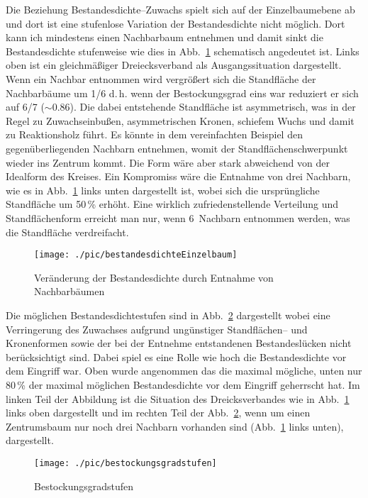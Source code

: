 \documentclass[twocolumn]{scrartcl}
\begin{document}
Die Beziehung Bestandesdichte--Zuwachs spielt sich auf der Einzelbaumebene ab
und dort ist eine stufenlose Variation der Bestandesdichte nicht möglich. Dort
kann ich mindestens einen Nachbarbaum entnehmen und damit sinkt die
Bestandesdichte stufenweise wie dies in Abb.~\ref{fig:bestandesdichteEinzelbaum}
schematisch angedeutet ist. Links oben ist ein gleichmäßiger Dreiecksverband als
Ausgangssituation dargestellt. Wenn ein Nachbar entnommen wird vergrößert sich
die Standfläche der Nachbarbäume um 1/6 d.\,h. wenn der Bestockungsgrad eins war
reduziert er sich auf 6/7 ($\sim 0.86$). Die dabei entstehende Standfläche ist
asymmetrisch, was in der Regel zu Zuwachseinbußen, asymmetrischen Kronen,
schiefem Wuchs und damit zu Reaktionsholz führt. Es könnte in dem vereinfachten
Beispiel den gegenüberliegenden Nachbarn entnehmen, womit der
Standflächenschwerpunkt wieder ins Zentrum kommt. Die Form wäre aber stark
abweichend von der Idealform des Kreises. Ein Kompromiss wäre die Entnahme von
drei Nachbarn, wie es in Abb.~\ref{fig:bestandesdichteEinzelbaum} links unten
dargestellt ist, wobei sich die ursprüngliche Standfläche um 50\,\% erhöht. Eine
wirklich zufriedenstellende Verteilung und Standflächenform erreicht man nur,
wenn 6~Nachbarn entnommen werden, was die Standfläche verdreifacht.

\begin{figure}[htbp]
  \centering
  \texttt{[image: ./pic/bestandesdichteEinzelbaum]}
  \caption{Veränderung der Bestandesdichte durch Entnahme von Nachbarbäumen}
  \label{fig:bestandesdichteEinzelbaum}
\end{figure}

Die möglichen Bestandesdichtestufen sind in Abb.~\ref{fig:bestockungsgradstufen}
dargestellt wobei eine Verringerung des Zuwachses aufgrund ungünstiger
Standflächen-- und Kronenformen sowie der bei der Entnehme entstandenen
Bestandeslücken nicht berücksichtigt sind. Dabei spiel es eine Rolle wie hoch
die Bestandesdichte vor dem Eingriff war. Oben wurde angenommen das die maximal
mögliche, unten nur 80\,\% der maximal möglichen Bestandesdichte vor dem
Eingriff geherrscht hat. Im linken Teil der Abbildung ist die Situation des
Dreicksverbandes wie in Abb.~\ref{fig:bestandesdichteEinzelbaum} links oben
dargestellt und im rechten Teil der Abb.~\ref{fig:bestockungsgradstufen}, wenn
um einen Zentrumsbaum nur noch drei Nachbarn vorhanden sind
(Abb.~\ref{fig:bestandesdichteEinzelbaum} links unten), dargestellt.

\begin{figure}[htbp]
  \centering
  \texttt{[image: ./pic/bestockungsgradstufen]}
  \caption{Bestockungsgradstufen}
  \label{fig:bestockungsgradstufen}
\end{figure}
\end{document}
